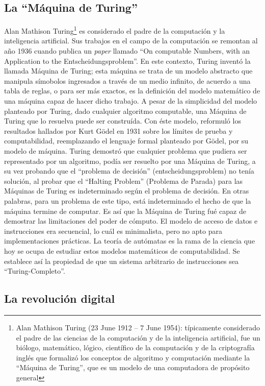 \subsection{La ``Máquina de Turing''}
\label{subsec:theory-history-turing}

Alan Mathison Turing\footnote{Alan Mathison Turing (23 June 1912 – 7 June 1954):
típicamente considerado el padre de las ciencias de la computación y de la
inteligencia artificial, fue un biólogo, matemático, lógico, científico de la
computación y de la criptografía inglés que formalizó los conceptos de algoritmo
y computación mediante la ``Máquina de Turing'', que es un modelo de una
computadora de propósito general} es considerado el padre de la computación y
la inteligencia artificial. Sus trabajos en el campo de la computación se
remontan al año 1936 cuando publica un \emph{paper} llamado ``On computable
Numbers, with an Application to the Entscheidungsproblem''. En este contexto,
Turing inventó la llamada Máquina de Turing; esta máquina se trata de un modelo
abstracto que manipula símobolos ingresados a través de un medio infinito, de
acuerdo a una tabla de reglas, o para ser más exactos, es la definición del
modelo matemático de una máquina capaz de hacer dicho trabajo. A pesar de la
simplicidad del modelo planteado por Turing, dado cualquier algoritmo
computable, una Máquina de Turing que lo resuelva puede ser construída. Con éste
modelo, reformuló los resultados hallados por Kurt Gödel en 1931 sobre los
límites de prueba y computabilidad, reemplazando el lenguaje formal planteado
por Gödel, por su modelo de máquina. Turing demostró que cualquier problema que
pudiera ser representado por un algoritmo, podía ser resuelto por una Máquina de
Turing, a su vez probando que el ``problema de decisión'' (entscheidungsproblem)
no tenía solución, al probar que el ``Halting Problem'' (Problema de Parada)
para las Máquinas de Turing es indeterminado según el problema de decisión. En
otras palabras, para un problema de este tipo, está indeterminado el hecho de
que la máquina termine de computar. Es así que la Máquina de Turing fué capaz de
demostrar las limitaciones del poder de cómputo. El modelo de acceso de datos e
instrucciones era secuencial, lo cuál es minimalista, pero no apto para
implementaciones prácticas. La teoría de autómatas es la rama de la ciencia que
hoy se ocupa de estudiar estos modelos matemáticos de computabilidad. Se
establece así la propiedad de que un sistema arbitrario de instrucciones sea
``Turing-Completo''.

\subsection{La revolución digital}
\label{subsec:theory-history-digital_revolution}

